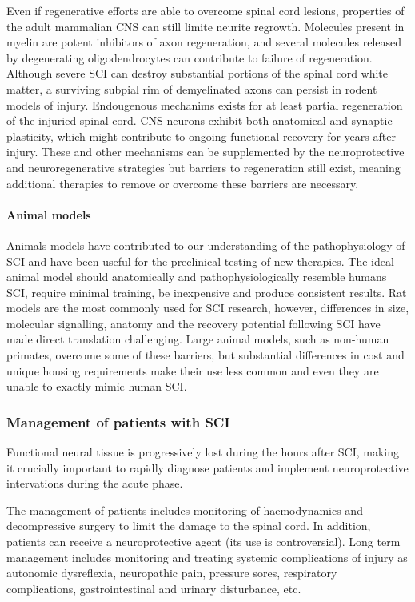\documentclass[12pt,article,oneside,a4paper]{memoir}
\begin{document}
Even if regenerative efforts are able to overcome spinal cord lesions,
properties of the adult mammalian CNS can still limite neurite regrowth.
Molecules present in myelin are potent inhibitors of axon regeneration, and
several molecules released by degenerating oligodendrocytes can contribute to
failure of regeneration. 
Although severe SCI can destroy substantial portions of the spinal cord white
matter, a surviving subpial rim of demyelinated axons can persist in rodent
models of injury. Endougenous mechanims exists for at least partial
regeneration of the injuried spinal cord. CNS neurons exhibit both anatomical
and synaptic plasticity, which might contribute to ongoing functional recovery
for years after injury. These and other mechanisms can be supplemented by the
neuroprotective and neuroregenerative strategies but barriers to regeneration
still exist, meaning additional therapies to remove or overcome these barriers
are necessary.

\paragraph{Animal models}
Animals models have contributed to our understanding of the pathophysiology of
SCI and have been useful for the preclinical testing of new therapies. The
ideal animal model should anatomically and pathophysiologically resemble humans
SCI, require minimal training, be inexpensive and produce consistent results.
Rat models are the most commonly used for SCI research, however, differences in
size, molecular signalling, anatomy and the recovery potential following SCI
have made direct translation challenging. Large animal models, such as
non-human primates, overcome some of these barriers, but substantial
differences in cost and unique housing requirements make their use less common
and even they are unable to exactly mimic human SCI.

\subsubsection{Management of patients with SCI}
Functional neural tissue is progressively lost during the hours after SCI,
making it crucially important to rapidly diagnose patients and implement
neuroprotective intervations during the acute phase.

The management of patients includes monitoring of haemodynamics and
decompressive surgery to limit the damage to the spinal cord. In addition,
patients can receive a neuroprotective agent (its use is controversial). Long
term management includes monitoring and treating systemic complications of
injury as autonomic dysreflexia, neuropathic pain, pressure sores, respiratory
complications, gastrointestinal and urinary disturbance, etc.
\end{document}
